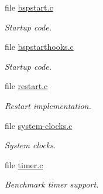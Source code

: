\begin{DoxyCompactItemize}
file \mbox{\hyperlink{arm_2lpc32xx_2start_2bspstart_8c}{bspstart.\+c}}
\begin{DoxyCompactList}\small\item\em Startup code. \end{DoxyCompactList}\item 
file \mbox{\hyperlink{lpc32xx_2start_2bspstarthooks_8c}{bspstarthooks.\+c}}
\begin{DoxyCompactList}\small\item\em Startup code. \end{DoxyCompactList}\item 
file \mbox{\hyperlink{arm_2lpc32xx_2start_2restart_8c}{restart.\+c}}
\begin{DoxyCompactList}\small\item\em Restart implementation. \end{DoxyCompactList}\item 
file \mbox{\hyperlink{lpc32xx_2start_2system-clocks_8c}{system-\/clocks.\+c}}
\begin{DoxyCompactList}\small\item\em System clocks. \end{DoxyCompactList}\item 
file \mbox{\hyperlink{arm_2lpc32xx_2start_2timer_8c}{timer.\+c}}
\begin{DoxyCompactList}\small\item\em Benchmark timer support. \end{DoxyCompactList}\end{DoxyCompactItemize}
